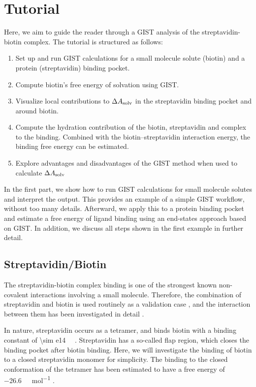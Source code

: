 \documentclass[9pt,tutorial,pubversion]{livecoms}
\newcommand{\dasolv}{\Delta A_\textup{solv}}
\begin{document}
\section{Tutorial}
Here, we aim to guide the reader through a GIST analysis of the streptavidin-biotin complex.
The tutorial is structured as follows:
\begin{enumerate}
	\item Set up and run GIST calculations for a small molecule solute (biotin) and a protein (streptavidin) binding pocket.
	\item Compute biotin's free energy of solvation using GIST.
	\item Visualize local contributions to $\dasolv$ in the streptavidin binding pocket and around biotin.
	\item Compute the hydration contribution of the biotin, streptavidin and complex to the binding. 
	Combined with the biotin--streptavidin interaction energy, the binding free energy can be estimated.
	\item Explore advantages and disadvantages of the GIST method when used to calculate $\dasolv$
\end{enumerate}
In the first part, we show how to run GIST calculations for small molecule solutes and interpret the output. 
This provides an example of a simple GIST workflow, without too many details.
Afterward, we apply this to a protein binding pocket and estimate a free energy of ligand binding using an end-states approach based on GIST. 
In addition, we discuss all steps shown in the first example in further detail. 


\subsection{Streptavidin/Biotin}
The streptavidin-biotin complex binding is one of the strongest known non-covalent interactions involving a small molecule.
Therefore, the combination of streptavidin and biotin is used routinely as a validation case \cite{Dundas2013-streptavidin-review}, and the interaction between them has been investigated in detail \cite{McConnell2021-biotin}.

\newcommand{\appr}{{\mathord{\sim}}}
In nature, streptavidin occurs as a tetramer, and binds biotin with a binding constant of \qty{\sim e14}{\per\Molar} \cite{Dundas2013-streptavidin-review}.
Streptavidin has a so-called flap region, which closes the binding pocket after biotin binding.
Here, we will investigate the binding of biotin to a closed streptavidin monomer for simplicity.
The binding to the closed conformation of the tetramer has been estimated to have a free energy of \qty{-26.6}{\kilo\calorie\per\mol} \cite{Bansal2018-biotin}.
\end{document}
